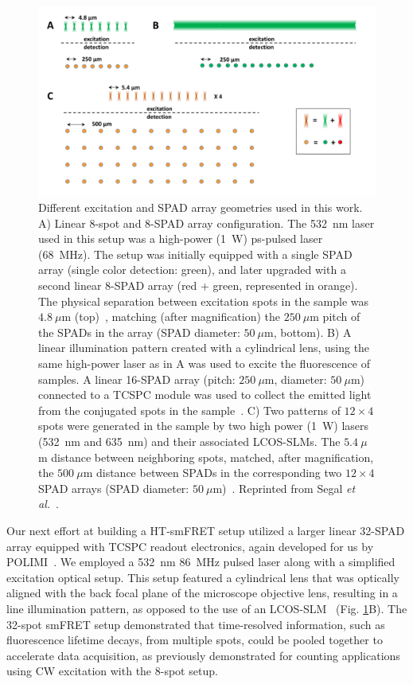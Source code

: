\begin{figure} 
\centering\includegraphics[width=\textwidth]{chapters/figures/multispot_geometries.png}
\caption{\label{fig:multispot_geometries} Different excitation and \ac{SPAD} array geometries used in this work.
A) Linear 8-spot and 8-\ac{SPAD} array configuration. 
The 532~nm laser used in this setup was a high-power (1~W) ps-pulsed laser (68~MHz).
The setup was initially equipped with a single \ac{SPAD} array (single color detection: green), and later upgraded with a second linear 8-\ac{SPAD} array (red + green, represented in orange). 
The physical separation between excitation spots in the sample was $4.8~\mu$m (top)~\cite{colyer_BOE_2010}, matching (after magnification) the $250~\mu$m pitch of the \ac{SPAD}s in the array (\ac{SPAD} diameter: $50~\mu$m, bottom).
B) A linear illumination pattern created with a cylindrical lens, using the same high-power laser as in A was used to excite the fluorescence of samples. 
A linear 16-\ac{SPAD} array (pitch: $250~\mu$m, diameter: $50~\mu$m) connected to a \ac{TCSPC} module was used to collect the emitted light from the conjugated spots in the sample~\cite{ingargiola_SPIE_2016}.
C) Two patterns of $12\times4$ spots were generated in the sample by two high power (1~W) lasers (532~nm and 635~nm) and their associated \ac{LCOS-SLM}s. 
The $5.4~\mu$m distance between neighboring spots, matched, after magnification, the $500~\mu$m distance between \ac{SPAD}s in the corresponding two $12\times4$ \ac{SPAD} arrays 
(\ac{SPAD} diameter: $50~\mu$m)~\cite{ingargiola_JCP_2018}.
Reprinted from Segal \textit{et al.}~\cite{segal_methods_2019}.
}
\end{figure}

Our next effort at building a \ac{HT-smFRET} setup utilized a larger linear 32-\ac{SPAD} array equipped with \ac{TCSPC} readout electronics, again developed for us by \ac{POLIMI}~\cite{cuccato_IEEEPJ_2013}.
We employed a 532~nm 86~MHz pulsed laser along with a simplified excitation optical setup. 
This setup featured a cylindrical lens that was optically aligned with the back focal plane of the microscope objective lens, resulting in a line illumination pattern, as opposed to the use of an \ac{LCOS-SLM}~\cite{ingargiola_SPIE_2017} (Fig. \ref{fig:multispot_geometries}B). 
The 32-spot \ac{smFRET} setup demonstrated that time-resolved information, such as fluorescence lifetime decays, from multiple spots, could be pooled together to accelerate data acquisition, as previously demonstrated for counting applications using \ac{CW} excitation with the 8-spot setup.

